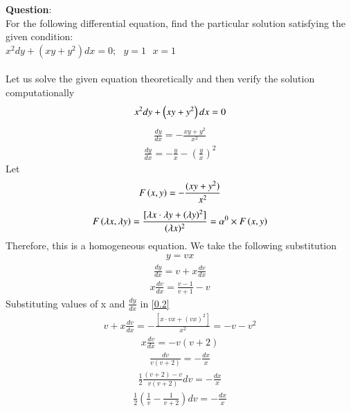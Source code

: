 \documentclass[journal]{IEEEtran}
\begin{document}
\textbf{Question}:\\
For the following differential equation, find the particular solution satisfying the given condition:\\
$x^2 dy + (xy+y^2) dx = 0 ; \text{ }y=1 \text{ }x=1 $\\
\solution \\
Let us solve the given equation theoretically and then verify the solution computationally
\begin{align}
    x^2 dy + \left(xy +y^2\right) dx = 0 
\end{align}
\begin{align}
    \frac{dy}{dx}= - \frac{xy +y^2}{x^2}
    \label{0.2}
\end{align}
\begin{align}
    \frac{dy}{dx}= -\frac{y}{x} - (\frac{y}{x})^2
\end{align}
Let
\begin{align*}
    F\left(x,y\right)=-\frac{(xy+y^2)}{x^2}
\end{align*}
\begin{align}
    F\left(\lambda x,\lambda y\right)=\frac{[\lambda x \cdot \lambda y + (\lambda y)^2]}{(\lambda x)^2} = {\alpha}^0 \times F\left(x,y\right)
\end{align}
Therefore, this is a homogeneous equation. We take the following substitution 
\begin{align}
    y = v x 
\end{align}
\begin{align}
    \frac{dy}{dx} = v + x \frac{dv}{dx}
\end{align}
\begin{align}
    x\frac{dv}{dx}=\frac{v-1}{v+1}-v
\end{align}
Substituting values of x and $\frac{dy}{dx}$ in \ref{0.2}
\begin{align}
    v + x \frac{dv}{dx} = - \frac{[x \cdot vx + (vx)^2]}{x^2} = -v -v^2
\end{align}
\begin{align}
    x\frac{dv}{dx} = -v(v+2)
\end{align}
\begin{align}
    \frac{dv}{v(v+2)} = - \frac{dx}{x}
\end{align}
\begin{align}
    \frac{1}{2} \frac{(v+2)-v}{v(v+2)} dv = - \frac{dx}{x}
\end{align}
\begin{align}
    \frac{1}{2} (\frac{1}{v} - \frac{1}{v+2}) dv = - \frac{dx}{x} 
\end{align}
\end{document}
